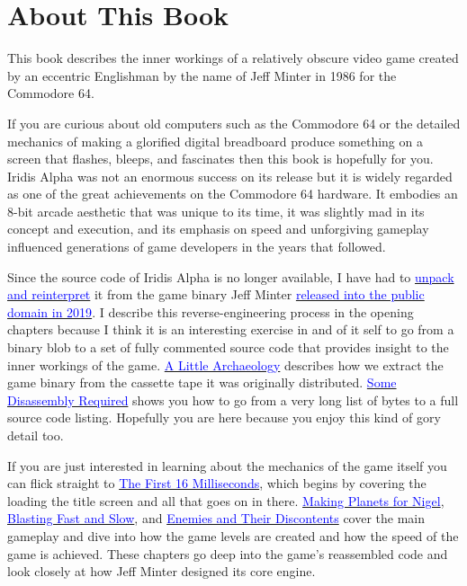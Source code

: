 \chapter*{About This Book} 
This book describes the inner workings of a relatively obscure video game created
by an eccentric Englishman by the name of Jeff Minter in 1986 for the Commodore 64.

If you are curious about old computers such as the Commodore 64 or the detailed mechanics
of making a glorified digital breadboard produce something on a screen that flashes, bleeps,
and fascinates then this book is hopefully for you. Iridis Alpha was not an enormous success on its release
but it is widely regarded as one of the great achievements on the Commodore 64 hardware. It embodies an 8-bit arcade aesthetic that was
unique to its time, it was slightly mad in its concept and execution, and its emphasis on speed and unforgiving gameplay influenced
generations of game developers in the years that followed.

Since the source code of Iridis Alpha is no longer available, I have had to \href{https://github.com/mwenge/iridisalpha}{\textcolor{blue}{unpack and reinterpret}} it
from the game binary Jeff Minter \href{https://www.llamasoftarchive.org/oldsite/llamasoft/cbm64/IridisAlpha.zip}{\textcolor{blue}{released into the public domain in 2019}}. I describe this
reverse-engineering process in the opening chapters because I think it is an interesting exercise in and of it self to go from
a binary blob to a set of fully commented source code that provides insight to the inner workings of the game. 
\hyperref[sec:archaeo]{\textcolor{blue}{A Little Archaeology}} describes how we extract the game binary from the cassette
tape it was originally distributed. \hyperref[sec:dis]{\textcolor{blue}{Some Disassembly Required}} shows you how to go from 
a very long list of bytes to a full source code listing. Hopefully you are here because you enjoy this kind of gory detail too.

If you are just interested in learning about the mechanics of the game itself you can flick straight to \hyperref[sec:first16]{\textcolor{blue}{The First 16 Milliseconds}}, 
which begins by covering the loading the title screen and all that goes on in there. \hyperref[sec:planets]{\textcolor{blue}{Making Planets for Nigel}},
\hyperref[sec:blast]{\textcolor{blue}{Blasting Fast and Slow}}, and \hyperref[sec:level]{\textcolor{blue}{Enemies and Their Discontents}} cover the main gameplay
and dive into how the game levels are created and how the speed of the game is achieved. These chapters go deep into the game's reassembled code and look closely at how
Jeff Minter designed its core engine.

